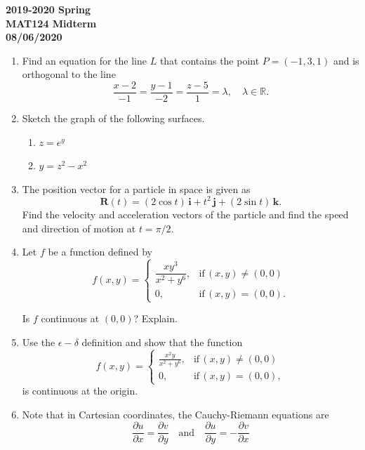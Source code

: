 \documentclass[a4paper, 12pt]{article}
\begin{document}
\newpage
{}
{}
\begin{center}
\textbf{2019-2020 Spring \\MAT124 Midterm\\08/06/2020}
\end{center}

\begin{enumerate}[leftmargin=*,label=\textbf{\arabic*.}]
\item Find an equation for the line $L$ that contains the point $P= (-1,3,1)$ and is orthogonal to the line
\[\frac{x-2}{-1}=\frac{y-1}{-2}=\frac{z-5}{1}=\lambda,\quad\lambda\in\mathbb{R}.\]

\item Sketch the graph of the following surfaces.

\begin{enumerate}[leftmargin=*,label=\textbf{\alph*.}]
\item $z= e^y$ \item $y=z^2-x^2$
\end{enumerate}

\item The position vector for a particle in space is given as
\[\textbf{R}(t) = (2\cos t)\,\textbf{i}+t^2\,\textbf{j}+(2\sin t)\,\textbf{k}.\]
Find the velocity and acceleration vectors of the particle and find the speed and direction of motion at $t=\pi/2$.

\item Let $f$ be a function defined by
\[
f(x,y) =
\left.
\begin{cases}
\dfrac{xy^3}{x^2+y^6},&\text{if}\, (x, y)\neq (0,0)\\[1em]0,&\text{if}\,(x,y)=(0,0).
\end{cases}
\right.
\]

Is $f$ continuous at $(0,0)$? Explain.

\item Use the $\epsilon - \delta$ definition and show that the function
\[
f(x,y) =
\left.
\begin{cases}
\displaystyle \frac{x^2y}{x^2+y^6},&\text{if}\, (x, y)\neq (0,0)\\[1em]0,&\text{if}\,(x,y)=(0,0),
\end{cases}
\right.
\]
is continuous at the origin.

\item Note that in Cartesian coordinates, the Cauchy-Riemann equations are
\[\frac{\partial u}{\partial x}=\frac{\partial v}{\partial y}\quad\text{and}\quad\frac{\partial u}{\partial y}=-\frac{\partial v}{\partial x}\]


\end{enumerate}
\end{document}
